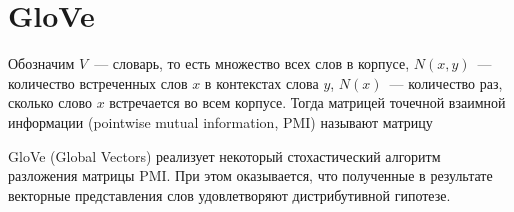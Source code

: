 \section{GloVe}

Обозначим $V$~--- словарь, то есть множество всех слов в корпусе, $N(x, y)$~--- количество встреченных слов $x$ в контекстах слова $y$, $N(x)$~--- количество раз, сколько слово $x$ встречается во всем корпусе. Тогда матрицей точечной взаимной информации (pointwise mutual information, PMI) называют матрицу

\begin{figure}[!htb]
\end{figure}

GloVe (Global Vectors) реализует некоторый стохастический алгоритм разложения матрицы PMI. При этом оказывается, что полученные в результате векторные представления слов удовлетворяют дистрибутивной гипотезе.
